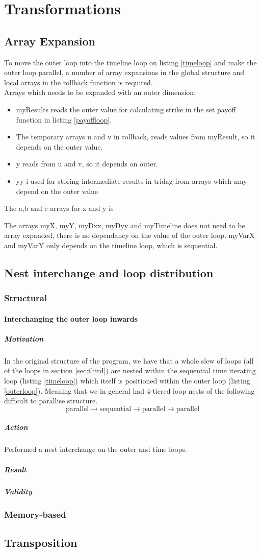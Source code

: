 \section{Transformations}

\subsection{Array Expansion}

To move the outer loop into the timeline loop on listing \ref{timeloop} and make the outer loop parallel, a number of array expansions in the global structure and local arrays in the rollback function is required.\\
Arrays which needs to be expanded with an outer dimension: 
\begin{itemize}
\item myResults reads the outer value for calculating strike in the set payoff function in listing \ref{payoffloop}.
\item The temporary arrays u and v in rollback, reads values from myResult, so it depends on the outer value. 
\item y reads from u and v, so it depends on outer. 
\item yy i used for storing intermediate results in tridag from arrays which may depend on the outer value 
\end{itemize}
The a,b and c arrays for x and y is 

The arrays myX, myY, myDxx, myDyy and myTimeline does not need to be array expanded, there is no dependancy on the value of the outer loop. myVarX and myVarY only depends on the timeline loop, which is sequential.

\subsection{Nest interchange and loop distribution}

\subsubsection{Structural}
\paragraph{Interchanging the outer loop inwards}
\subparagraph{Motivation} In the original structure of the program, we have that a whole slew of loops
 (all of the loops in section \ref{sec:third}) are nested
 within the sequential time iterating loop (listing \ref{timeloop}) which itself is positioned within
 the outer loop (listing \ref{outerloop}). Meaning that we in general had 4-tiered loop nests of the following difficult to parallise
 structure.
$$\mathrm{parallel} \to \mathrm{sequential} \to \mathrm{parallel} \to \mathrm{parallel}$$

\subparagraph{Action} Performed a nest interchange on the outer and time loops.

\subparagraph{Result}

\subparagraph{Validity}


\subsubsection{Memory-based}


\subsection{Transposition}

